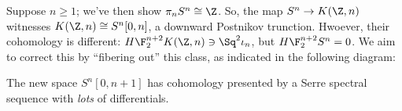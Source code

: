Suppose $n \ge 1$; we've then show $\pi_n S^n \cong \Z$.  So, the map $S^n \to K(\Z, n)$ witnesses $K(\Z, n) \cong S^n[0, n]$, a downward Postnikov trunction.  Hwoever, their cohomology is different: $H\F_2^{n+2} K(\Z, n) \ni \Sq^2 \iota_n$, but $H\F_2^{n+2} S^n = 0$.  We aim to correct this by ``fibering out'' this class, as indicated in the following diagram:
\begin{center}
\end{center}
The new space $S^n[0, n+1]$ has cohomology presented by a Serre spectral sequence with \emph{lots} of differentials.

